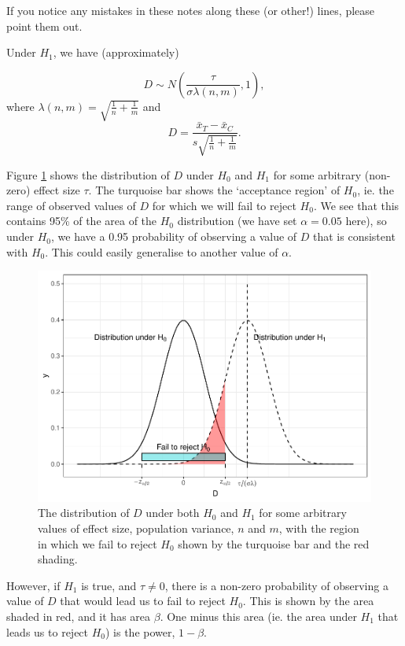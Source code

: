 \documentclass[
  openany]{book}
\theoremstyle{definition}
\theoremstyle{definition}
\theoremstyle{definition}
\theoremstyle{definition}
\theoremstyle{remark}
\begin{document}
If you notice any mistakes in these notes along these (or other!) lines, please point them out.

Under \(H_1\), we have (approximately)

\[D \sim{N\left(\frac{\tau}{\sigma\lambda\left(n,m\right)}, 1\right)},\]
where \(\lambda\left(n,m\right) = \sqrt{\frac{1}{n}+\frac{1}{m}}\) and
\[D = \frac{\bar{x}_T - \bar{x}_C}{s\sqrt{\frac{1}{n} + \frac{1}{m}}}.\]

Figure \ref{fig:accepth0} shows the distribution of \(D\) under \(H_0\) and \(H_1\) for some arbitrary (non-zero) effect size \(\tau\). The turquoise bar shows the `acceptance region' of \(H_0\), ie. the range of observed values of \(D\) for which we will fail to reject \(H_0\). We see that this contains 95\% of the area of the \(H_0\) distribution (we have set \(\alpha = 0.05\) here), so under \(H_0\), we have a 0.95 probability of observing a value of \(D\) that is consistent with \(H_0\). This could easily generalise to another value of \(\alpha\).

\begin{figure}
\centering
\includegraphics{CT4H_notes_files/figure-latex/accepth0-1.pdf}
\caption{\label{fig:accepth0}The distribution of \(D\) under both \(H_0\) and \(H_1\) for some arbitrary values of effect size, population variance, \(n\) and \(m\), with the region in which we fail to reject \(H_0\) shown by the turquoise bar and the red shading.}
\end{figure}

However, if \(H_1\) is true, and \(\tau\neq{0}\), there is a non-zero probability of observing a value of \(D\) that would lead us to fail to reject \(H_0\). This is shown by the area shaded in red, and it has area \(\beta\). One minus this area (ie. the area under \(H_1\) that leads us to reject \(H_0\)) is the power, \(1-\beta\).
\end{document}
